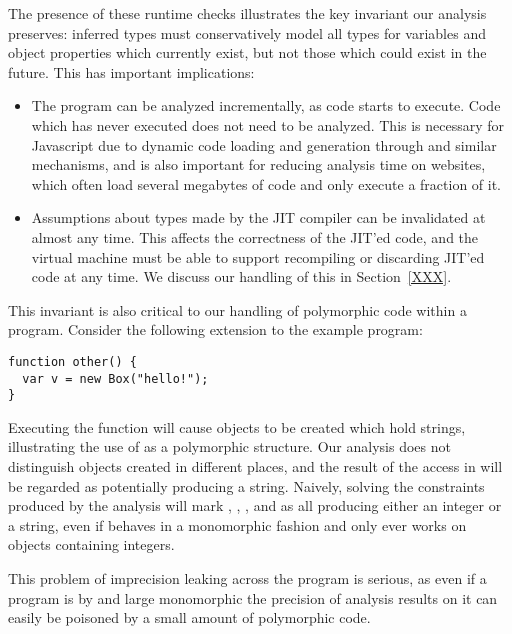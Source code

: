 The presence of these runtime checks illustrates the key invariant our analysis
preserves: inferred types must conservatively model all types for
variables and object properties which currently exist, but not those
which could exist in the future.
This has important implications:

\begin{itemize}

\item The program can be analyzed incrementally, as code starts to execute.
Code which has never executed does not need to be analyzed.
This is necessary for Javascript due to dynamic code loading
and generation through
 and similar mechanisms, and is also important for reducing
analysis time on websites, which often load several megabytes of
code and only execute a fraction of it.

\item Assumptions about types made by the JIT compiler can be invalidated
at almost any time.
This affects the correctness of the JIT'ed code, and the virtual machine
must be able to support recompiling or discarding JIT'ed code at any time.
We discuss our handling of this in Section~\ref{XXX}.

\end{itemize}

This invariant is also critical to our handling of polymorphic code
within a program.
Consider the following extension to the example program:

\begin{lstlisting}[numbers=none]
function other() {
  var v = new Box("hello!");
}
\end{lstlisting}

Executing the  function will cause  objects
to be created which hold strings,
illustrating the use of  as a polymorphic structure.
Our analysis does not distinguish  objects created in different
places, and the result of the  access in  will
be regarded as potentially producing a string.
Naively, solving the constraints produced by the analysis will mark
, , , and  as all producing
either an integer or a string, even if  behaves in a monomorphic
fashion and only ever works on  objects containing integers.

This problem of imprecision leaking across the program is serious, as even
if a program is by and large monomorphic the precision of analysis results on
it can easily be poisoned by a small amount of polymorphic code.

